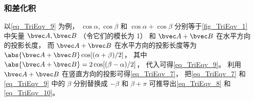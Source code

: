 \subsubsection{和差化积}
以\autoref{eq_TriEqv_9} 为例， $\cos \alpha, \cos \beta$ 和 $\cos \alpha + \cos \beta$ 分别等于\autoref{fig_TriEqv_1} 中矢量 $\bvec A, \bvec B$ （令它们的模长为 1） 和 $\bvec A + \bvec B$ 在水平方向的投影长度， 而 $\bvec A + \bvec B$ 在水平方向的投影长度等为 $\abs{\bvec A + \bvec B}\cos[(\alpha+\beta)/2]$， 其中 $\abs{\bvec A + \bvec B} = 2\cos [(\beta-\alpha)/2]$， 代入可得\autoref{eq_TriEqv_9}。 利用 $\bvec A + \bvec B$ 在竖直方向的投影可得\autoref{eq_TriEqv_7}， 把\autoref{eq_TriEqv_7} 和\autoref{eq_TriEqv_9} 中的 $\beta$ 分别替换成 $-\beta$ 和 $\beta+\pi$ 可推导出\autoref{eq_TriEqv_8} 和\autoref{eq_TriEqv_10}。
